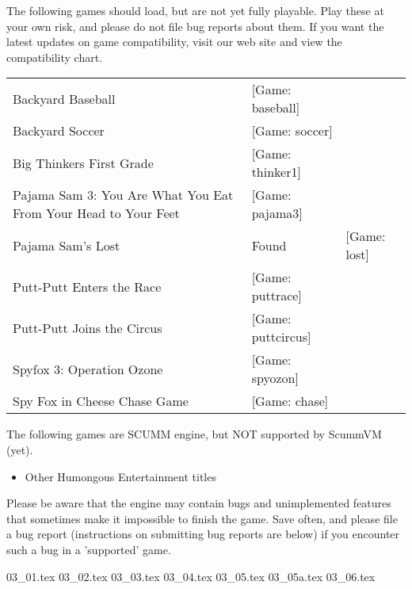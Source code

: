 \begin{itemize}
  The following games should load, but are not yet fully playable. Play these at your own risk, and please do not file bug reports about them. If you want
the latest updates on game compatibility, visit our web site and view the
compatibility chart.

\begin{tabular}{ll}
  Backyard Baseball&                                             [Game: baseball]\\
  Backyard Soccer&                                               [Game: soccer]\\
  Big Thinkers First Grade&                                      [Game: thinker1]\\
  Pajama Sam 3: You Are What You Eat From Your Head to Your Feet&[Game: pajama3]\\
  Pajama Sam's Lost & Found&                                     [Game: lost]\\
  Putt-Putt Enters the Race&                                     [Game: puttrace]\\
  Putt-Putt Joins the Circus&                                    [Game: puttcircus]\\
  Spyfox 3: Operation Ozone&                                     [Game: spyozon]\\
  Spy Fox in Cheese Chase Game&                                  [Game: chase]\\
\end{tabular}

  The following games are SCUMM engine, but NOT supported by ScummVM (yet).
  \begin{itemize}
  \item Other Humongous Entertainment titles
  \end{itemize}
%
Please be aware that the engine may contain bugs and unimplemented features
that sometimes make it impossible to finish the game. Save often, and please
file a bug report (instructions on submitting bug reports are below) if you
encounter such a bug in a 'supported' game.
\end{itemize}
 {03_01.tex}
 {03_02.tex}
 {03_03.tex}
 {03_04.tex}
 {03_05.tex}
 {03_05a.tex}
 {03_06.tex}
